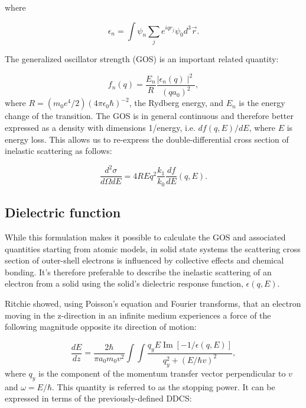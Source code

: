 \documentclass [11pt, proquest, article] {uwthesis}[2016/11/22]
\begin{document}
where

\begin{equation}
	\epsilon_n = \int \psi_n \sum_j e^{i q r_j} \psi_0 d^3\vec{r}.
\end{equation}


The generalized oscillator strength (GOS) is an important related quantity:

\begin{equation}
f_n(q) = \frac{E_n}{R} \frac{\mid \epsilon_n(q)\mid ^2}{(q a_0)^2},
\end{equation}
where $R = (m_0 e^4 / 2)(4 \pi \epsilon_0 \hbar)^{-2}$, the Rydberg energy, and $E_n$ is the energy change of the transition. 
The GOS is in general continuous and therefore better expressed as a density with dimensions 1/energy, i.e. $df(q, E)/dE$, where $E$ is energy loss. This allows us to re-express the double-differential cross section of inelastic scattering as follows:

\begin{equation} \label{inelastic_DDCS}
\frac{d^2\sigma}{d\Omega dE} = {4 R}{Eq^2} \frac{k_1}{k_0} \frac{df}{dE}(q, E).
\end{equation}


\subsection{Dielectric function}
While this formulation makes it possible to calculate the GOS and associated quantities starting from atomic models, in solid state systems the scattering cross section of outer-shell electrons is influenced by collective effects and chemical bonding. It's therefore preferable to describe the inelastic scattering of an electron from a solid using the solid's dielectric response function, $\epsilon(q, E)$. 

Ritchie showed, using Poisson's equation and Fourier transforms, that an electron moving in the z-direction in an infinite medium experiences a force of the following magnitude opposite its direction of motion: 


\begin{equation} \label{stp}
\frac{dE}{dz} = \frac{2\hbar}{\pi a_0 m_0 v^2} \int \int \frac{q_y E \operatorname{Im}[-1/\epsilon(q, E)]}{q_y^2 + (E/\hbar v)^2},
\end{equation}
where $q_y$ is the component of the momentum transfer vector perpendicular to $v$ and $\omega = E/\hbar$.\cite{ritchie1957plasma} This quantity is referred to as the stopping power. It can be expressed in terms of the previously-defined DDCS:
\end{document}
